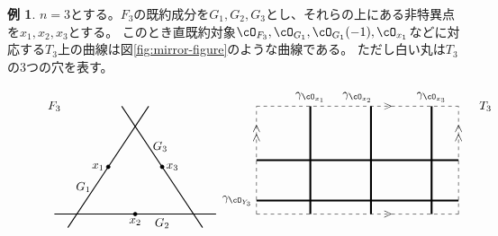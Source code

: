 \documentclass[uplatex,11pt,a4paper,dvipdfmx]{jsarticle}
\numberwithin{equation}{section}
\numberwithin{figure}{section}
\theoremstyle{definition}
\newtheorem{example}[theorem]{例}
\begin{document}
\begin{example}\label{correspondence_of_objects}
    $n=3$とする。$F_3$の既約成分を$G_1, G_2, G_3$とし、それらの上にある非特異点を$x_1, x_2, x_3$とする。
    このとき直既約対象$\cO_{F_3}, \cO_{G_1}, \cO_{G_1}(-1), \cO_{x_1}$などに対応する$T_3$上の曲線は図\ref{fig:mirror-figure}のような曲線である。
    ただし白い丸は$T_3$の$3$つの穴を表す。
    \begin{figure}[h]
        \centering
        \begin{displaymath}
            \begin{tikzpicture}[scale = 0.4]
                \draw(-10, 8) node{$F_3$};
                \draw[thick] (-9,-1)--(-3,8);
                \draw[thick] (-10,0)--(2,0);
                \draw[thick] (1,-1)--(-5,8);

                \filldraw[black] (-6, 3.5) circle (4pt);
                \filldraw[black] (-4, 0) circle (4pt);
                \filldraw[black] (-2, 3.5) circle (4pt);

                \draw(-6, 3.5) node[left]{$x_1$};
                \draw(-4, 0) node[below]{$x_2$};
                \draw(-2, 3.5) node[right]{$x_3$};

                \draw(-7, 2) node[left]{$G_1$};
                \draw(-2, 0) node[below]{$G_2$};
                \draw(-3, 5) node[right]{$G_3$};

                \draw(22, 8) node{$T_3$};
                \draw[dashed] (5,0)--(20,0);
                \draw(14.75, 0) node{$>$};
                \draw[dashed] (5,0)--(5,8);
                \draw(5, 6) node{\rotatebox{90}{$>>$}};
                \draw[dashed] (5,8)--(20,8);
                \draw(14.75, 8) node{$>$};
                \draw[dashed] (20,0)--(20,8);
                \draw(20, 6) node{\rotatebox{90}{$>>$}};

                \draw[ultra thick] (5, 1)--(20, 1);
                \draw[ultra thick] (5, 4)--(20, 4);
                \draw(5, 1) node[left]{$\gamma_{\cO_{Y_3}}$};

                \draw[ultra thick] (8+1, 0)--(8+1, 8);
                \draw(8+1, 8) node[above]{$\gamma_{\cO_{x_1}}$};
                \draw[ultra thick] (12.5+1, 0)--(12.5+1, 8);
                \draw(12.5, 8) node[above]{$\gamma_{\cO_{x_2}}$};
                \draw[ultra thick] (17+1, 0)--(17+1, 8);
                \draw(17+1, 8) node[above]{$\gamma_{\cO_{x_3}}$};


\end{tikzpicture}
\end{displaymath}
\end{figure}
\end{example}
\end{document}

